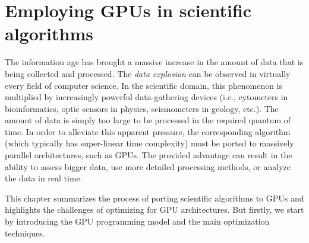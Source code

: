 \chapter{Employing GPUs in scientific algorithms}
\label{chap:gpu}

The information age has brought a massive increase in the amount of data that is being collected and processed. The \emph{data explosion} can be observed in virtually every field of computer science. In the scientific domain, this phenomenon is multiplied by increasingly powerful data-gathering devices (i.e., cytometers in bioinformatics, optic sensors in physics, seismometers in geology, etc.). The amount of data is simply too large to be processed in the required quantum of time. In order to alleviate this apparent pressure, the corresponding algorithm (which typically has super-linear time complexity) must be ported to massively parallel architectures, such as GPUs. The provided advantage can result in the ability to assess bigger data, use more detailed processing methods, or analyze the data in real time.

This chapter summarizes the process of porting scientific algorithms to GPUs and highlights the challenges of optimizing for GPU architectures. But firstly, we start by introducing the GPU programming model and the main optimization techniques.






